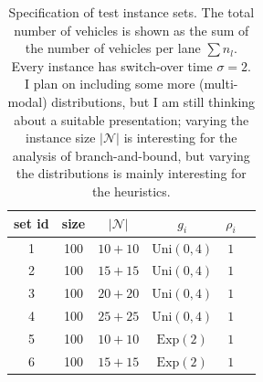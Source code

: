 \documentclass[a4paper]{article}
\theoremstyle{definition}
\theoremstyle{plain}
\begin{document}
\begin{table}[H]
  \caption{Specification of test instance sets. The total number of vehicles is
    shown as the sum of the number of vehicles per lane $\sum n_{l}$. Every
    instance has switch-over time $\sigma = 2$. {\color{blue} I plan on including
      some more (multi-modal) distributions, but I am still thinking about a
      suitable presentation; varying the instance size $|\mathcal{N}|$ is
      interesting for the analysis of branch-and-bound, but varying the
      distributions is mainly interesting for the heuristics.}}
    \label{tab:params}

  \centering
  \begin{tabular}[t]{c c c c c c}
    \toprule
    set id & size & $|\mathcal{N}|$ & $g_{i}$ & $\rho_{i}$ \\
    \midrule

    1 & 100 & $10 + 10$ & $\text{Uni}(0, 4)$ & $1$ \\
    2 & 100 & $15 + 15$ & $\text{Uni}(0, 4)$ & $1$ \\
    3 & 100 & $20 + 20$ & $\text{Uni}(0, 4)$ & $1$ \\
    4 & 100 & $25 + 25$ & $\text{Uni}(0, 4)$ & $1$ \\ %

    5 & 100 & $10 + 10$ & $\text{Exp}(2)$    & $1$ \\
    6 & 100 & $15 + 15$ & $\text{Exp}(2)$    & $1$ \\

    \bottomrule
  \end{tabular}
\end{table}





%
\end{document}
